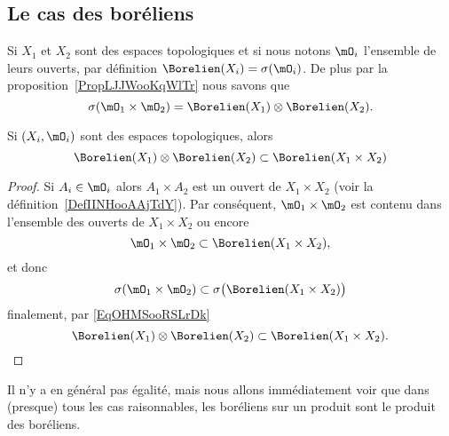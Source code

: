 \subsection{Le cas des boréliens}

Si \( X_1\) et  \( X_2\) sont des espaces topologiques et si nous notons \( \mO_i\) l'ensemble de leurs ouverts, par définition \( \Borelien(X_i)=\sigma(\mO_i)\). De plus par la proposition~\ref{PropLJJWooKqWlTr} nous savons que
\begin{equation}        \label{EqOHMSooRSLrDk}
    \sigma(\mO_1\times \mO_2)=\Borelien(X_1)\otimes \Borelien(X_2).
\end{equation}

\begin{lemma}       \label{LemDEDQooJyzXgC}
    Si \( (X_i,\mO_i)\) sont des espaces topologiques, alors
    \begin{equation}
        \Borelien(X_1)\otimes \Borelien(X_2)\subset \Borelien(X_1\times X_2)
    \end{equation}
\end{lemma}

\begin{proof}
    Si \( A_i\in \mO_i\) alors \( A_1\times A_2\) est un ouvert de \( X_1\times X_2\) (voir la définition~\ref{DefIINHooAAjTdY}). Par conséquent, \( \mO_1\times \mO_2\) est contenu dans l'ensemble des ouverts de \( X_1\times X_2\) ou encore
    \begin{equation}
        \mO_1\times \mO_2\subset\Borelien(X_1\times X_2),
    \end{equation}
    et donc
    \begin{equation}
        \sigma(\mO_1\times \mO_2)\subset\sigma\big( \Borelien(X_1\times X_2) \big)
    \end{equation}
    finalement, par \eqref{EqOHMSooRSLrDk}
    \begin{equation}
        \Borelien(X_1)\otimes\Borelien(X_2)\subset\Borelien(X_1\times X_2).
    \end{equation}
\end{proof}

Il n'y a en général pas égalité, mais nous allons immédiatement voir que dans (presque) tous les cas raisonnables, les boréliens sur un produit sont le produit des boréliens.

